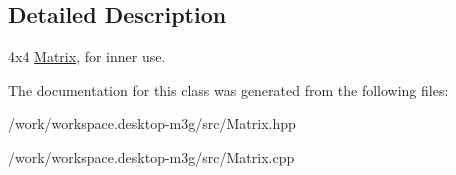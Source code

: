 \subsection{Detailed Description}
4x4 \hyperlink{classm3g_1_1Matrix}{Matrix}, for inner use. 

The documentation for this class was generated from the following files:\begin{CompactItemize}
\item 
/work/workspace.desktop-m3g/src/Matrix.hpp\item 
/work/workspace.desktop-m3g/src/Matrix.cpp\end{CompactItemize}
